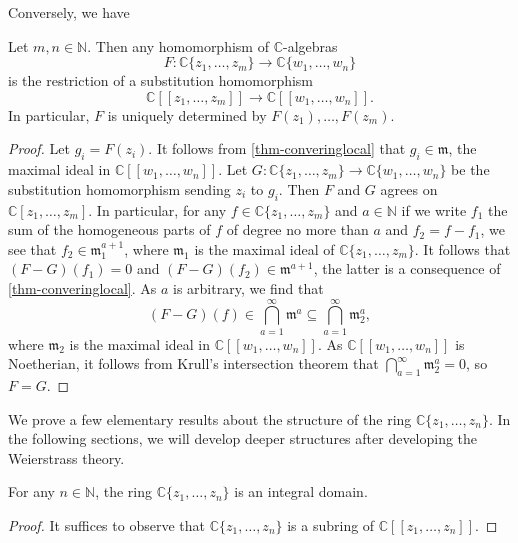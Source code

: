 Conversely, we have
\begin{lemma}\label{lma-homopowerringanalytic}
    Let $m,n\in \mathbb{N}$. Then any homomorphism of $\mathbb{C}$-algebras 
    \[
        F:  \mathbb{C}\{ z_1,\ldots,z_m\}\rightarrow  \mathbb{C}\{ w_1,\ldots,w_n\}
    \]
    is the restriction of a substitution homomorphism
    \[
        \mathbb{C}[[z_1,\ldots,z_m]]\rightarrow  \mathbb{C} [[ w_1,\ldots,w_n]].
    \]
    In particular, $F$ is uniquely determined by $F(z_1),\ldots,F(z_m)$.  
\end{lemma}
\begin{proof}
    Let $g_i=F(z_i)$. It follows from \cref{thm-converinglocal} that $g_i\in \mathfrak{m}$, the maximal ideal in $\mathbb{C} [[ w_1,\ldots,w_n]]$. Let $G:\mathbb{C}\{ z_1,\ldots,z_m\}\rightarrow  \mathbb{C}\{ w_1,\ldots,w_n\}$ be the substitution homomorphism sending $z_i$ to $g_i$. Then $F$ and $G$ agrees on $\mathbb{C}[z_1,\ldots,z_m]$. In particular, for any $f\in \mathbb{C}\{ z_1,\ldots,z_m\}$ and $a\in \mathbb{N}$ if we write $f_1$ the sum of the homogeneous parts of $f$ of degree no more than $a$ and $f_2=f-f_1$, we see that $f_2\in \mathfrak{m}_1^{a+1}$, where $\mathfrak{m}_1$ is the maximal ideal of $\mathbb{C}\{ z_1,\ldots,z_m\}$. It follows that $(F-G)(f_1)=0$ and $(F-G)(f_2)\in \mathfrak{m}^{a+1}$, the latter is a consequence of \cref{thm-converinglocal}.
    As $a$ is arbitrary, we find that
    \[
      (F-G)(f)\in \bigcap_{a=1}^{\infty}\mathfrak{m}^a\subseteq  \bigcap_{a=1}^{\infty}\mathfrak{m}_2^a,
    \]
    where $\mathfrak{m}_2$ is the maximal ideal in $\mathbb{C} [[ w_1,\ldots,w_n]]$.
    As $\mathbb{C}[[w_1,\ldots,w_n]] $ is Noetherian, it follows from Krull's intersection theorem \cite[\href{https://stacks.math.columbia.edu/tag/00IP}{Tag 00IP}]{stacks-project} that $\bigcap_{a=1}^{\infty}\mathfrak{m}_2^a=0$, so $F=G$.
\end{proof}

We prove a few elementary results about the structure of the ring $\mathbb{C}\{ z_1,\ldots,z_n \}$. In the following sections, we will develop deeper structures after developing the Weierstrass theory.

\begin{proposition}\label{prop-convpowerinteg}
    For any $n\in \mathbb{N}$, the ring $\mathbb{C}\{ z_1,\ldots,z_n \}$ is an integral domain.
\end{proposition}
\begin{proof}
    It suffices to observe that $\mathbb{C}\{ z_1,\ldots,z_n \}$ is a subring of $\mathbb{C}[[z_1,\ldots,z_n]]$.
\end{proof}




